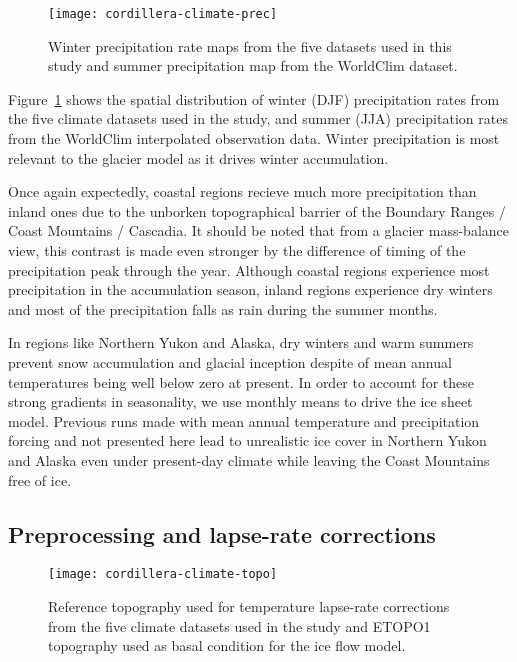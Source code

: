 \begin{figure}[t]
	\vspace*{2mm}
	\begin{center}
		\texttt{[image: cordillera-climate-prec]}
	\end{center}
	\caption{Winter precipitation rate maps from the five datasets used in this study and summer precipitation map from the WorldClim dataset.}
	\label{fig:prec}
\end{figure}

Figure~\ref{fig:prec} shows the spatial distribution of winter (DJF) precipitation rates from the five climate datasets used in the study, and summer (JJA) precipitation rates from the WorldClim interpolated observation data. Winter precipitation is most relevant to the glacier model as it drives winter accumulation.

Once again expectedly, coastal regions recieve much more precipitation than inland ones due to the unborken topographical barrier of the Boundary Ranges / Coast Mountains / Cascadia. It should be noted that from a glacier mass-balance view, this contrast is made even stronger by the difference of timing of the precipitation peak through the year. Although coastal regions experience most precipitation in the accumulation season, inland regions experience dry winters and most of the precipitation falls as rain during the summer months.

In regions like Northern Yukon and Alaska, dry winters and warm summers prevent snow accumulation and glacial inception despite of mean annual temperatures being well below zero at present. In order to account for these strong gradients in seasonality, we use monthly means to drive the ice sheet model. Previous runs made with mean annual temperature and precipitation forcing and not presented here lead to unrealistic ice cover in Northern Yukon and Alaska even under present-day climate while leaving the Coast Mountains free of ice.


\subsection{Preprocessing and lapse-rate corrections}

\begin{figure}[t]
	\vspace*{2mm}
	\begin{center}
		\texttt{[image: cordillera-climate-topo]}
	\end{center}
	\caption{Reference topography used for temperature lapse-rate corrections from the five climate datasets used in the study and ETOPO1 topography used as basal condition for the ice flow model.}
	\label{fig:topo}
\end{figure}

